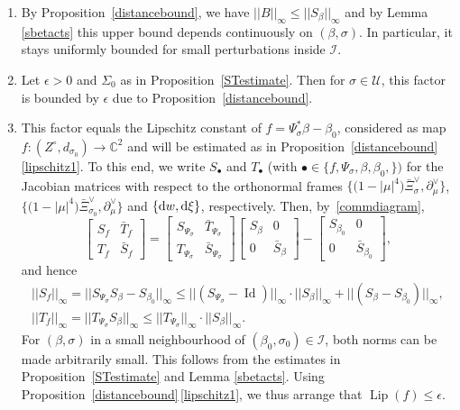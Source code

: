 \documentclass[pdftex]{sigma}
\numberwithin{equation}{section}
\theoremstyle{definition}
\newcommand{\C}{\mathbb{C}} %
\newcommand{\1}{{\bf 1}}
\newcommand{\Id}{\operatorname{Id}}
\DeclareMathOperator{\Lip}{Lip}
\begin{document}
\begin{enumerate}[label=\rm(\alph*)]\itemsep=0pt
	\item By Proposition~\ref{distancebound}, we have $||B||_\infty \le || S_\beta ||_\infty$ and by Lemma \ref{sbetacts} this upper bound depends continuously on $(\beta,\sigma)$. In particular, it stays uniformly bounded for small perturbations inside $\mathcal I$.
	
	\item Let $\epsilon>0$ and $\Sigma_0$ as in Proposition~\ref{STestimate}. Then for $\sigma\in \mathcal U$, this factor is bounded by $\epsilon$ due to Proposition~\ref{distancebound}.
	
	
	\item This factor equals the Lipschitz constant of $f=\Psi_\sigma^*\beta- \beta_0$, considered as map $f\colon (Z^\circ, d_{\sigma_0})\rightarrow \C^2$ and will be estimated as in Proposition~\ref{distancebound}\,\ref{lipschitz1}. To this end, we write $S_\bullet$ and $T_\bullet$ (with $\bullet \in \{f,\Psi_\sigma,\beta,\beta_0, \})$ for the Jacobian matrices with respect to the orthonormal frames
$\big\{\bigl(1-|\mu|^4\bigr)\bar{\Xi}^\vee_\sigma,\partial_\mu^\vee\big\}$, $ \big\{\bigl(1-|\mu|^4\bigr)\bar{\Xi}^\vee_{\sigma_0},\partial_\mu^\vee\big\}$ and $\{{\rm d}w,{\rm d}\xi\}$,
 respectively. Then, by~\eqref{commdiagram},
\[
	\begin{bmatrix}
		S_f & \bar T_f\\
		T_f & \bar S_f
	\end{bmatrix}
	=
	\begin{bmatrix}
		S_{\Psi_\sigma} & \bar T_{\Psi_\sigma}\\
		T_{\Psi_\sigma} & \bar S_{\Psi_\sigma}
	\end{bmatrix}
	\begin{bmatrix}
		S_\beta & 0\\
		0 & \bar S_\beta
	\end{bmatrix}
	-
	\begin{bmatrix}
		S_{\beta_0} & 0\\
		0 & \bar S_{\beta_0}
	\end{bmatrix},
\]
and hence
\begin{gather*}
	|| S_f ||_\infty = || S_{\Psi_\sigma}S_\beta - S_{\beta_0}||_\infty \le || (S_{\Psi_\sigma}-\Id) ||_\infty\cdot ||S_\beta||_\infty + ||(S_\beta - S_{\beta_0})||_\infty,\\
	||T_f||_\infty =|| T_{\Psi_\sigma}S_\beta||_\infty \le ||T_{\Psi_\sigma} ||_\infty \cdot || S_\beta||_\infty.
\end{gather*}
For $(\beta,\sigma)$ in a small neighbourhood of $(\beta_0,\sigma_0)\in \mathcal I$, both norms can be made arbitrarily small. This follows from the estimates in Proposition~\ref{STestimate} and Lemma \ref{sbetacts}. Using Proposition~\ref{distancebound}\,\ref{lipschitz1}, we thus arrange that $\Lip (f) \le \epsilon $.
\end{enumerate}
\end{document}
